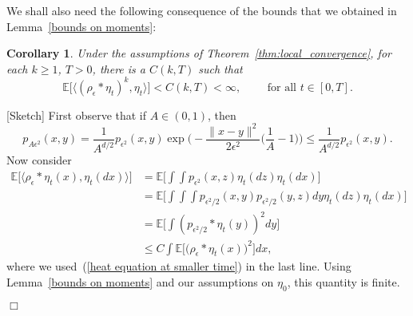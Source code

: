 \documentclass[12pt]{article}
\newenvironment {proof}{{\noindent\bf Proof }}{\hfill $\Box$ \medskip}
\newtheorem{corollary}[theorem]{Corollary}
\newcommand{\IE}{\mathbb E}
\numberwithin{equation}{section}
\begin{document}
We shall also need the following consequence of the bounds that we obtained in 
Lemma~\ref{bounds on moments}:
\begin{corollary}
\label{alternative form moment bounds}
Under the assumptions of Theorem~\ref{thm:local_convergence},
for each $k\geq 1$, $T>0$, there is a $C(k,T)$ such that
\begin{equation}
\label{double integrals with respect to eta}
\IE\Big[\big\langle (\rho_\epsilon*\eta_t)^{k},\eta_t\big\rangle \Big]
<C(k,T)<\infty, \qquad\mbox{ for all }t\in [0,T].
\end{equation}
\end{corollary}
\begin{proof}[Sketch]
First observe that if $A\in (0,1)$, then 
\begin{equation}
\label{heat equation at smaller time}
p_{A\epsilon^2}(x,y)
=\frac{1}{A^{d/2}}p_{\epsilon^2}(x,y)\exp\Big(-\frac{\|x-y\|^2}{2\epsilon^2}
\big(\frac{1}{A}-1\big)\Big)\leq \frac{1}{A^{d/2}}p_{\epsilon^2}(x,y).
\end{equation}
Now consider
    \begin{align*}
\IE\big[\langle \rho_\epsilon*\eta_t(x),\eta_t(dx)\rangle\big]&=
\IE\Big[\int\int p_{\epsilon^2}(x,z)\eta_t(dz)\eta_t(dx)\Big]
\\        
&=
\IE\Big[\int\int\int p_{\epsilon^2/2}(x,y) 
p_{\epsilon^2/2}(y,z)dy\eta_t(dz)\eta_t(dx)\Big]
        \\ &=
       \IE\Big[ \int \left( p_{\epsilon^2/2} * \eta_t(y) \right)^2 dy \Big]
\\&\leq C\int \IE\big[\big(\rho_\epsilon*\eta_t(x)\big)^2\big] dx,
    \end{align*}
where we used~(\ref{heat equation at smaller time}) in the last line.
Using Lemma~\ref{bounds on moments}
and our assumptions on $\eta_0$, this quantity is finite.


\end{proof}
\end{document}
